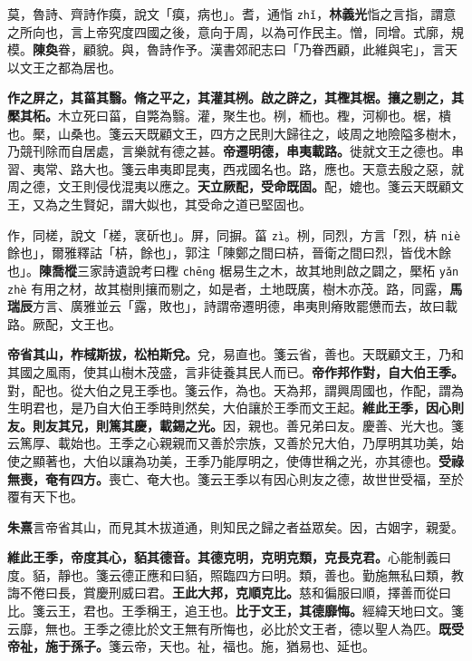 \begin{quoting}莫，魯詩、齊詩作瘼，說文「瘼，病也」。耆，通恉 \texttt{zhǐ}，\textbf{林義光}恉之言指，謂意之所向也，言上帝究度四國之後，意向于周，以為可作民主。憎，同增。式廓，規模。\textbf{陳奐}眷，顧貌。與，魯詩作予。漢書郊祀志曰「乃眷西顧，此維與宅」，言天以文王之都為居也。\end{quoting}

\textbf{作之屏之，其菑其翳。脩之平之，其灌其栵。啟之辟之，其檉其椐。攘之剔之，其檿其柘。}{\footnotesize 木立死曰菑，自斃為翳。灌，聚生也。栵，栭也。檉，河柳也。椐，樻也。檿，山桑也。箋云天既顧文王，四方之民則大歸往之，岐周之地險隘多樹木，乃競刊除而自居處，言樂就有德之甚。}\textbf{帝遷明德，串夷載路。}{\footnotesize 徙就文王之德也。串習、夷常、路大也。箋云串夷即昆夷，西戎國名也。路，應也。天意去殷之惡，就周之德，文王則侵伐混夷以應之。}\textbf{天立厥配，受命既固。}{\footnotesize 配，媲也。箋云天既顧文王，又為之生賢妃，謂大姒也，其受命之道已堅固也。}

\begin{quoting}作，同槎，說文「槎，衺斫也」。屏，同摒。菑 \texttt{zì}。栵，同烈，方言「烈，枿 \texttt{niè} 餘也」，爾雅釋詁「枿，餘也」，郭注「陳鄭之間曰枿，晉衛之間曰烈，皆伐木餘也」。\textbf{陳喬樅}三家詩遺說考曰檉 \texttt{chēng} 椐易生之木，故其地則啟之闢之，檿柘 \texttt{yǎn zhè} 有用之材，故其樹則攘而剔之，如是者，土地既廣，樹木亦茂。路，同露，\textbf{馬瑞辰}方言、廣雅並云「露，敗也」，詩謂帝遷明德，串夷則瘠敗罷憊而去，故曰載路。厥配，文王也。\end{quoting}

\textbf{帝省其山，柞棫斯拔，松柏斯兌。}{\footnotesize 兌，易直也。箋云省，善也。天既顧文王，乃和其國之風雨，使其山樹木茂盛，言非徒養其民人而已。}\textbf{帝作邦作對，自大伯王季。}{\footnotesize 對，配也。從大伯之見王季也。箋云作，為也。天為邦，謂興周國也，作配，謂為生明君也，是乃自大伯王季時則然矣，大伯讓於王季而文王起。}\textbf{維此王季，因心則友。則友其兄，則篤其慶，載錫之光。}{\footnotesize 因，親也。善兄弟曰友。慶善、光大也。箋云篤厚、載始也。王季之心親親而又善於宗族，又善於兄大伯，乃厚明其功美，始使之顯著也，大伯以讓為功美，王季乃能厚明之，使傳世稱之光，亦其德也。}\textbf{受祿無喪，奄有四方。}{\footnotesize 喪亡、奄大也。箋云王季以有因心則友之德，故世世受福，至於覆有天下也。}

\begin{quoting}\textbf{朱熹}言帝省其山，而見其木拔道通，則知民之歸之者益眾矣。因，古姻字，親愛。\end{quoting}

\textbf{維此王季，帝度其心，貊其德音。其德克明，克明克類，克長克君。}{\footnotesize 心能制義曰度。貊，靜也。箋云德正應和曰貊，照臨四方曰明。類，善也。勤施無私曰類，教誨不倦曰長，賞慶刑威曰君。}\textbf{王此大邦，克順克比。}{\footnotesize 慈和徧服曰順，擇善而從曰比。箋云王，君也。王季稱王，追王也。}\textbf{比于文王，其德靡悔。}{\footnotesize 經緯天地曰文。箋云靡，無也。王季之德比於文王無有所悔也，必比於文王者，德以聖人為匹。}\textbf{既受帝祉，施于孫子。}{\footnotesize 箋云帝，天也。祉，福也。施，猶易也、延也。}

